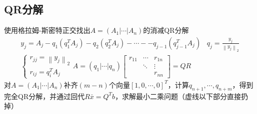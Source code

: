 \documentclass[twocolumn]{article}
\begin{document}
\subsection{QR分解}
使用格拉姆-斯密特正交找出$A=(A_1|\cdots|A_n)$的消减QR分解
\begin{align*}
    y_j=A_j-q_1(q_1^TA_j)-q_2(q_2^TA_j)-\cdots--q_{j-1}(q_{j-1}^TA_j) \,\,\,\,\, q_j=\frac{y_j}{\left\| y_j \right\|_2}\\
    \begin{cases}
        r_{jj}=\left\| y_j \right\|_2 \\
        r_{ij}=q_i^TA_j
    \end{cases}
    A=(q_1|\cdots|q_n)
    \begin{bmatrix}
        r_{11} & \cdots & r_{1n} \\
               & \ddots & \vdots \\
               &        & r_{nn}
    \end{bmatrix}
    =QR
\end{align*}
对$A=(A_1|\cdots|A_n)$补齐$(m-n)$个向量$[1,0,\cdots,0]^T$，计算$q_{n+1},\cdots,q_{n+m}$，得到完全QR分解，并通过回代$R\bar{x}=Q^Tb$，求解最小二乘问题（虚线以下部分直接扔掉）
\end{document}
